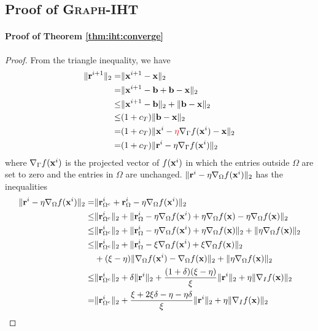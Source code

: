 \documentclass{article}
\begin{document}
\subsection{Proof of \textsc{Graph}-IHT}

\paragraph{Proof of Theorem \ref{thm:iht:converge}}
\begin{proof}
From the triangle inequality, we have
\begin{align*}
\|{\bf r}^{i+1}\|_2=&\|{\bf x}^{i+1}-{\bf x}\|_2\\
=&\|{\bf x}^{i+1}-{\bf b}+{\bf b}-{\bf x}\|_2\\
\leq&\|{\bf x}^{i+1}-{\bf b}\|_2+\|{\bf b}-{\bf x}\|_2\\
\leq&(1+c_T)\|{\bf b}-{\bf x}\|_2\\
=&(1+c_T)\|{\bf x}^i-{\color{red}{\eta}}\nabla_{\Gamma}f({\bf x}^i)-{\bf x}\|_2\\
=&(1+c_T)\|{\bf r}^i-\eta\nabla_{\Gamma}f({\bf x}^i)\|_2
\end{align*}
where $\nabla_{\Gamma}f({\bf x}^i)$ is the projected vector of $f({\bf x}^i)$ in which the entries outside $\Omega$ are set to zero and the entries in $\Omega$ are unchanged. $\|{\bf r}^i-\eta\nabla_{\Omega}f({\bf x}^i)\|_2$ has the inequalities
\begin{align*}
\|{\bf r}^i-\eta\nabla_{\Omega}f({\bf x}^i)\|_2=&\|{\bf r}_{\Omega^c}^i+{\bf r}_{\Omega}^i-\eta\nabla_{\Omega}f({\bf x}^i)\|_2\\
\leq&\|{\bf r}_{\Omega^c}^i\|_2+\|{\bf r}_{\Omega}^i-\eta\nabla_{\Omega}f({\bf x}^i)+\eta\nabla_{\Omega}f({\bf x})-\eta\nabla_{\Omega}f({\bf x})\|_2\\
\leq&\|{\bf r}_{\Omega^c}^i\|_2+\|{\bf r}_{\Omega}^i-\eta\nabla_{\Omega}f({\bf x}^i)+\eta\nabla_{\Omega}f({\bf x})\|_2+\|\eta\nabla_{\Omega}f({\bf x})\|_2\\
\leq&\|{\bf r}_{\Omega^c}^i\|_2+\|{\bf r}_{\Omega}^i-\xi\nabla_{\Omega}f({\bf x}^i)+\xi\nabla_{\Omega}f({\bf x})\|_2\\
&+(\xi-\eta)\|\nabla_{\Omega}f({\bf x}^i)-\nabla_{\Omega}f({\bf x})\|_2+\|\eta\nabla_{\Omega}f({\bf x})\|_2\\
\leq&\|{\bf r}_{\Omega^c}^i\|_2+\delta\|{\bf r}^i\|_2+\frac{(1+\delta)(\xi-\eta)}{\xi}\|{\bf r}^i\|_2+\eta\|\nabla_I f({\bf x})\|_2 \\
=&\|{\bf r}_{\Omega^c}^i\|_2+\frac{\xi+2\xi\delta-\eta-\eta\delta}{\xi}\|{\bf r}^i\|_2+\eta\|\nabla_I f({\bf x})\|_2\\

\end{align*}
\end{proof}
\end{document}
